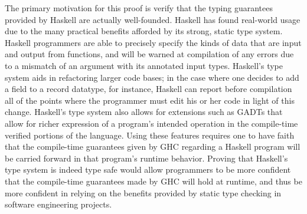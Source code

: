 \documentclass{sig-alternate}
\begin{document}
The primary motivation for this proof is verify that the typing guarantees provided by Haskell are actually well-founded. Haskell has found real-world usage due to the many practical benefits afforded by its strong, static type system. Haskell programmers are able to precisely specify the kinds of data that are input and output from functions, and will be warned at compilation of any errors due to a mismatch of an argument with its annotated input types. Haskell's type system aids in refactoring larger code bases; in the case where one decides to add a field to a record datatype, for instance, Haskell can report before compilation all of the points where the programmer must edit his or her code in light of this change. Haskell's type system also allows for extensions such as GADTs that allow for richer expression of a program's intended operation in the compile-time verified portions of the language. Using these features requires one to have faith that the compile-time guarantees given by GHC regarding a Haskell program will be carried forward in that program's runtime behavior. Proving that Haskell's type system is indeed type safe would allow programmers to be more confident that the compile-time guarantees made by GHC will hold at runtime, and thus be more confident in relying on the benefits provided by static type checking in software engineering projects.
\end{document}
